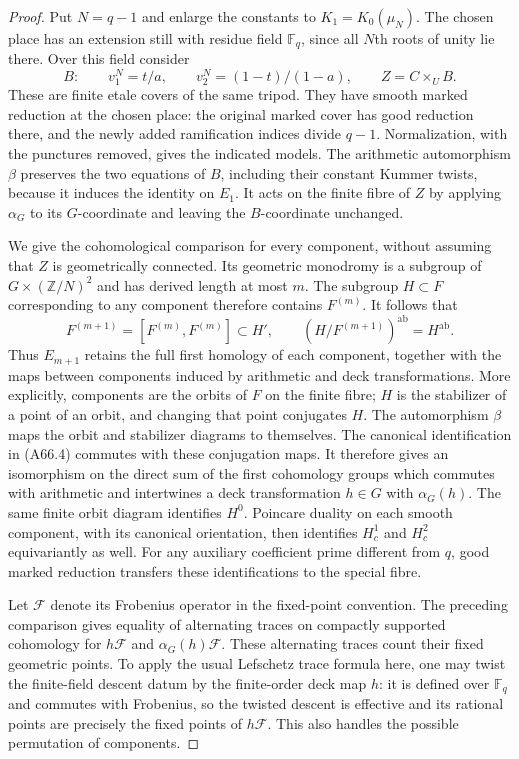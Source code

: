 \begin{proof}
Put $N=q-1$ and enlarge the constants to
$K_1=K_0(\mu_N)$. The chosen place has an
extension still with residue field $\mathbb F_q$,
since all $N$th roots of unity lie there.
Over this field consider
\[
 B:\qquad v_1^N=t/a,\qquad
             v_2^N=(1-t)/(1-a),\qquad
                   Z=C\times_U B.                    \tag{A66.3}
\]
These are finite etale covers of the same tripod.
They have smooth marked reduction at the chosen
place: the original marked cover has good
reduction there, and the newly added ramification
indices divide $q-1$. Normalization, with the
punctures removed, gives the indicated models.
The arithmetic automorphism $\beta$ preserves
the two equations of $B$, including their
constant Kummer twists, because it induces the
identity on $E_1$.
It acts on the finite fibre of $Z$ by applying
$\alpha_G$ to its $G$-coordinate and leaving the
$B$-coordinate unchanged.

We give the cohomological comparison for every
component, without assuming that $Z$ is
geometrically connected. Its geometric monodromy
is a subgroup of $G\times(\mathbb Z/N)^2$ and
has derived length at most $m$.
The subgroup $H\subset F$ corresponding to any
component therefore contains $F^{(m)}$.
It follows that
\[
 F^{(m+1)}=[F^{(m)},F^{(m)}]\subset H',
 \qquad
 (H/F^{(m+1)})^{\mathrm{ab}}=H^{\mathrm{ab}}.
                                                        \tag{A66.4}
\]
Thus $E_{m+1}$ retains the full first homology
of each component, together with the maps
between components induced by arithmetic and
deck transformations. More explicitly, components
are the orbits of $F$ on the finite fibre;
$H$ is the stabilizer of a point of an orbit,
and changing that point conjugates $H$.
The automorphism $\beta$ maps the orbit and
stabilizer diagrams to themselves. The canonical
identification in (A66.4) commutes with these
conjugation maps. It therefore gives an
isomorphism on the direct sum of the first
cohomology groups which commutes with arithmetic
and intertwines a deck transformation $h\in G$
with $\alpha_G(h)$.
The same finite orbit diagram identifies
$H^0$. Poincare duality on each smooth component,
with its canonical orientation, then identifies
$H_c^1$ and $H_c^2$ equivariantly as well.
For any auxiliary coefficient prime different
from $q$, good marked reduction transfers these
identifications to the special fibre.

Let $\mathcal F$ denote its Frobenius operator
in the fixed-point convention. The preceding
comparison gives equality of alternating traces
on compactly supported cohomology for
$h\mathcal F$ and $\alpha_G(h)\mathcal F$.
These alternating traces count their fixed
geometric points. To apply the usual
Lefschetz trace formula here, one may twist the
finite-field descent datum by the finite-order
deck map $h$: it is defined over $\mathbb F_q$
and commutes with Frobenius, so the twisted
descent is effective and its rational points
are precisely the fixed points of $h\mathcal F$.
This also handles the possible permutation of
components.


\end{proof}
